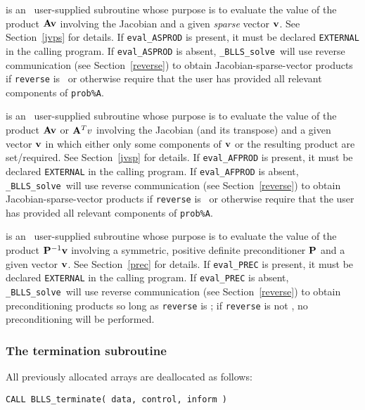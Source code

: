 \documentclass{galahad}
\newcommand{\packagename}{BLLS}
\newcommand{\fullpackagename}{\libraryname\_\packagename}
\newcommand{\solver}{{\tt \fullpackagename\_solve}}
\begin{document}
\begin{description}
 is an \optional\
user-supplied subroutine whose purpose is to evaluate the value of the
product ${\mathbf{A}} {\mathbf{v}}$  involving the Jacobian and a given {\em sparse}
vector ${\mathbf{v}}$.
See Section~\ref{jvps} for details.
If {\tt eval\_ASPROD} is present,
it must be declared {\tt EXTERNAL} in the calling program.
If {\tt eval\_ASPROD} is absent, \solver\ will use reverse communication
(see Section~\ref{reverse})
to obtain Jacobian-sparse-vector products if {\tt reverse} is \present\ or
otherwise require that the user has provided all relevant
components of {\tt prob\%A}.

 is an \optional\
user-supplied subroutine whose purpose is to evaluate the value of the
product ${\mathbf{A}} {\mathbf{v}}$ or ${\mathbf{A}}^T v$ involving the Jacobian (and its transpose)
and a given vector ${\mathbf{v}}$ in which either only some components of ${\mathbf{v}}$ or
the resulting product are set/required.
See Section~\ref{jvsp} for details.
If {\tt eval\_AFPROD} is present,
it must be declared {\tt EXTERNAL} in the calling program.
If {\tt eval\_AFPROD} is absent, \solver\ will use reverse communication
(see Section~\ref{reverse})
to obtain Jacobian-sparse-vector products if {\tt reverse} is \present\ or
otherwise require that the user has provided all relevant
components of {\tt prob\%A}.

 is an \optional\
user-supplied subroutine whose purpose is to evaluate the value of the
product ${\mathbf{P}}^{-1} {\mathbf{v}}$ involving a symmetric, positive definite
preconditioner ${\mathbf{P}}$ and a given vector ${\mathbf{v}}$.
See Section~\ref{prec} for details.
If {\tt eval\_PREC} is present,
it must be declared {\tt EXTERNAL} in the calling program.
If {\tt eval\_PREC} is absent, \solver\ will use reverse communication
(see Section~\ref{reverse})
to obtain preconditioning products so long as {\tt reverse} is \present;
if {\tt reverse} is not \present, no preconditioning will be performed.

\end{description}


\subsubsection{The  termination subroutine}
All previously allocated arrays are deallocated as follows:
\vspace*{1mm}

\hspace{8mm}
{\tt CALL \packagename\_terminate( data, control, inform )}
\end{document}
